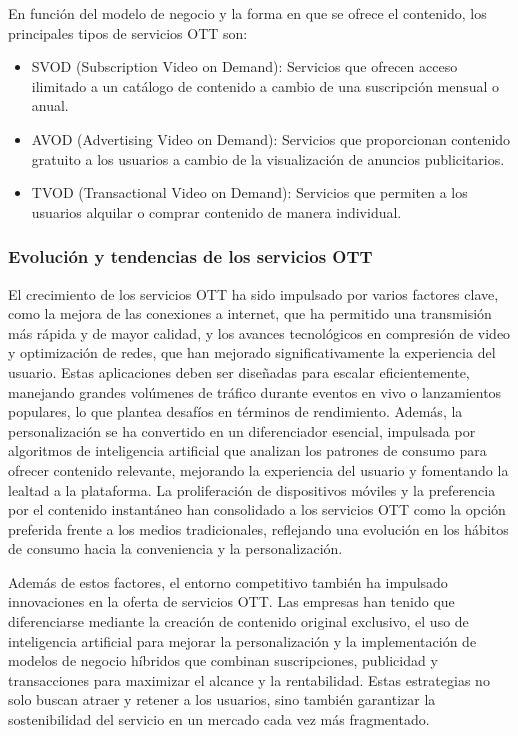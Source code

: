 En función del modelo de negocio y la forma en que se ofrece el contenido, los principales tipos de 
servicios OTT son:
\begin{itemize}
\item SVOD (Subscription Video on Demand): Servicios que ofrecen acceso ilimitado a un catálogo de contenido a cambio de una suscripción mensual o anual.
\item AVOD (Advertising Video on Demand): Servicios que proporcionan contenido gratuito a los usuarios a cambio de la visualización de anuncios publicitarios.
\item TVOD (Transactional Video on Demand): Servicios que permiten a los usuarios alquilar o comprar contenido de manera individual.
\end{itemize}

\subsubsection{Evolución y tendencias de los servicios OTT}
\label{sec:ott_evolucion_tendencias}

El crecimiento de los servicios OTT ha sido impulsado por varios factores clave, como la 
mejora de las conexiones a internet, que ha permitido una transmisión más rápida y de mayor 
calidad, y los avances tecnológicos en compresión de video y optimización de redes, que han 
mejorado significativamente la experiencia del usuario. Estas aplicaciones deben ser diseñadas 
para escalar eficientemente, manejando grandes volúmenes de tráfico durante eventos en vivo o 
lanzamientos populares, lo que plantea desafíos en términos de rendimiento. Además, la personalización 
se ha convertido en un diferenciador esencial, impulsada por algoritmos de inteligencia artificial 
que analizan los patrones de consumo para ofrecer contenido relevante, mejorando la experiencia del 
usuario y fomentando la lealtad a la plataforma. La proliferación de dispositivos móviles y la 
preferencia por el contenido instantáneo han consolidado a los servicios OTT como la opción preferida 
frente a los medios tradicionales, reflejando una evolución en los hábitos de consumo hacia la 
conveniencia y la personalización.

Además de estos factores, el entorno competitivo también ha impulsado innovaciones en la oferta de 
servicios OTT. Las empresas han tenido que diferenciarse mediante la creación de contenido original 
exclusivo, el uso de inteligencia artificial para mejorar la personalización y la implementación de 
modelos de negocio híbridos que combinan suscripciones, publicidad y transacciones para maximizar el 
alcance y la rentabilidad. Estas estrategias no solo buscan atraer y retener a los usuarios, sino 
también garantizar la sostenibilidad del servicio en un mercado cada vez más fragmentado.

